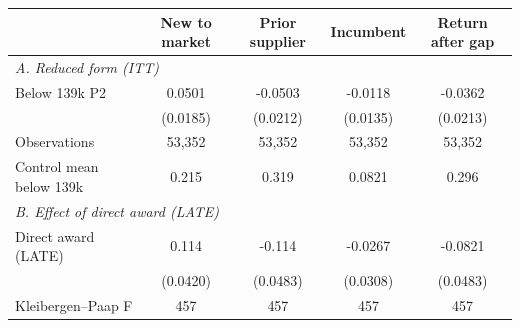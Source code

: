 \begin{tabular}{l*{4}{c}}
\toprule
            &\multicolumn{1}{c}{New to market}&\multicolumn{1}{c}{Prior supplier}&\multicolumn{1}{c}{Incumbent}&\multicolumn{1}{c}{Return after gap}\\
\midrule
\multicolumn{5}{l}{\textit{A. Reduced form (ITT)}}\\
Below 139k \texttimes{} P2&      0.0501\sym{***}&     -0.0503\sym{**} &     -0.0118         &     -0.0362\sym{*}  \\
            &    (0.0185)         &    (0.0212)         &    (0.0135)         &    (0.0213)         \\
\addlinespace
Observations&      53,352         &      53,352         &      53,352         &      53,352         \\
Control mean below 139k&       0.215         &       0.319         &      0.0821         &       0.296         \\
\midrule
\multicolumn{5}{l}{\textit{B. Effect of direct award (LATE)}}\\
\addlinespace[1pt]
Direct award (LATE)&       0.114\sym{***}&      -0.114\sym{**} &     -0.0267         &     -0.0821\sym{*}  \\
            &    (0.0420)         &    (0.0483)         &    (0.0308)         &    (0.0483)         \\
\addlinespace
Kleibergen--Paap F&         457         &         457         &         457         &         457         \\
\bottomrule
\end{tabular}
